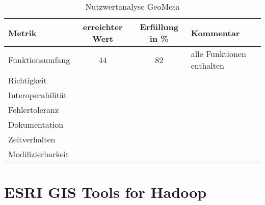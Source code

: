 \begin{table}[htp]
\centering
\small
\begin{tabular}{l|c|c|p{3cm}}
\textbf{Metrik} & \textbf{erreichter Wert} & \textbf{Erfüllung in \%} & \textbf{Kommentar} \\ \hline
Funktionsumfang & 44 & 82 & alle Funktionen enthalten \\ \hline
Richtigkeit &  &  &  \\ \hline
Interoperabilität &  &  &  \\ \hline
Fehlertoleranz &  &  &  \\ \hline
Dokumentation &  &  &  \\ \hline
Zeitverhalten &  &  &  \\ \hline
Modifizierbarkeit &  &  &  \\
\end{tabular}
\caption{Nutzwertanalyse GeoMesa}
\label{table:nutzwertanalyse-geomesa}
\end{table}



\section{ESRI GIS Tools for Hadoop}

